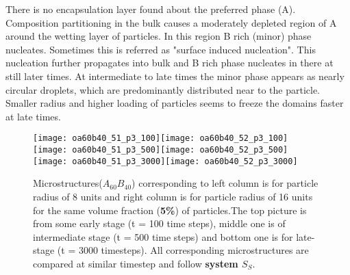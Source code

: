 \documentclass[12pt]{iiscthes}
\theoremstyle{definition}
\theoremstyle{definition}
\theoremstyle{remark}
\begin{document}
There is no encapsulation layer found about the preferred phase (A). Composition partitioning in the bulk causes a moderately depleted region of A around the wetting layer of particles. In this region B rich (minor) phase nucleates. Sometimes this is referred as "surface induced nucleation". This nucleation further propagates into bulk and B rich phase nucleates in there at still later times. At intermediate to late times the minor phase appears as nearly circular droplets, which are predominantly distributed near to the particle. Smaller radius and higher loading of particles seems to freeze the domains faster at late times.   
\newpage
\begin{figure}[H]
\begin{center}
\texttt{[image: oa60b40\_51\_p3\_100]}\texttt{[image: oa60b40\_52\_p3\_100]}\\
\texttt{[image: oa60b40\_51\_p3\_500]}\texttt{[image: oa60b40\_52\_p3\_500]}\\
\texttt{[image: oa60b40\_51\_p3\_3000]}\texttt{[image: oa60b40\_52\_p3\_3000]}\\
\caption{Microstructures($A_{60}B_{40}$) corresponding to left column is for particle radius of 8 units and right column is for particle radius of 16 units for the same volume fraction (\textbf{5\%}) of particles.The top picture is from some early stage (t = 100 time steps), middle one is of intermediate stage (t = 500 time steps) and bottom one is for late-stage (t = 3000 timesteps). All corresponding microstructures are compared at similar timestep and follow \textbf{system $S_S$}.}\label{o2512_p3}
\end{center}
\end{figure}
\end{document}

